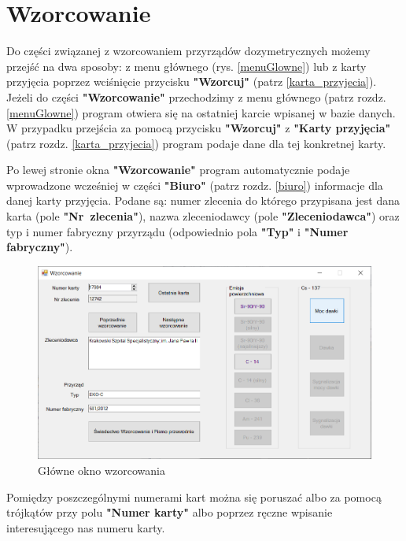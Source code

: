 
\rozdzial

\section{Wzorcowanie}
\label{wzorcowanie}

Do części związanej z wzorcowaniem przyrządów dozymetrycznych możemy przejść na dwa sposoby: z menu głównego (rys. \ref{menuGlowne}) lub z karty przyjęcia poprzez wciśnięcie przycisku \textbf{"Wzorcuj"} (patrz \ref{karta_przyjecia}). Jeżeli do części \textbf{"Wzorcowanie"} przechodzimy z menu głównego (patrz rozdz. \ref{menuGlowne}) program otwiera się na ostatniej karcie wpisanej w bazie danych. W przypadku przejścia za pomocą przycisku \textbf{"Wzorcuj"} z \textbf{"Karty przyjęcia"} (patrz rozdz. \ref{karta_przyjecia}) program podaje dane dla tej konkretnej karty.

Po lewej stronie okna \textbf{"Wzorcowanie"} program automatycznie podaje wprowadzone wcześniej w części \textbf{"Biuro"} (patrz rozdz. \ref{biuro}) informacje dla danej karty przyjęcia. Podane są: numer zlecenia do którego przypisana jest dana karta (pole \textbf{"Nr~zlecenia"}), nazwa zleceniodawcy (pole \textbf{"Zleceniodawca"}) oraz typ i numer fabryczny przyrządu (odpowiednio pola \textbf{"Typ"} i \textbf{"Numer fabryczny"}). 

\begin{figure}[htb]
	\centering
	\includegraphics[width=\columnwidth]{obrazki/Wzorcowanie/menu_wzorcowanie.png}
	\caption{Główne okno wzorcowania}
	\label{menuWzorcowanie}
\end{figure}

Pomiędzy poszczególnymi numerami kart można się poruszać albo za pomocą trójkątów przy polu \textbf{"Numer karty"} albo poprzez ręczne wpisanie interesującego nas numeru karty.

